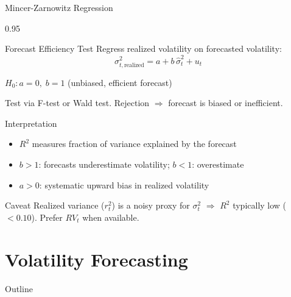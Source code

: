 \documentclass[9pt, aspectratio=169, t]{beamer}
\begin{document}
\begin{frame}{Mincer-Zarnowitz Regression}
    \begin{cminipage}{0.95\textwidth}
    \footnotesize
    \vspace{-0.2cm}
    \begin{block}{Forecast Efficiency Test}
        Regress realized volatility on forecasted volatility:
        \[
            \sigma_{t,\text{realized}}^2 = a + b \, \hat{\sigma}_t^2 + u_t
        \]
    \end{block}
    \vspace{-0.1cm}
    \begin{defn}[Hypotheses]
        $H_0: a = 0, \; b = 1$ \quad (unbiased, efficient forecast)

        Test via F-test or Wald test. Rejection $\Rightarrow$ forecast is biased or inefficient.
    \end{defn}
    \vspace{-0.1cm}
    \begin{exampleblock}{Interpretation}
        \begin{itemize}\setlength{\itemsep}{0pt}
            \item $R^2$ measures fraction of variance explained by the forecast
            \item $b > 1$: forecasts underestimate volatility; $b < 1$: overestimate
            \item $a > 0$: systematic upward bias in realized volatility
        \end{itemize}
    \end{exampleblock}
    \vspace{-0.1cm}
    \begin{alertblock}{Caveat}
        Realized variance ($r_t^2$) is a noisy proxy for $\sigma_t^2$ $\Rightarrow$ $R^2$ typically low ($< 0.10$). Prefer $RV_t$ when available.
    \end{alertblock}
    \end{cminipage}
\end{frame}

\section{Volatility Forecasting}

\begin{frame}{Outline}
    \small
    \vspace{-0.2cm}
    \tableofcontents[currentsection]
\end{frame}
\end{document}
